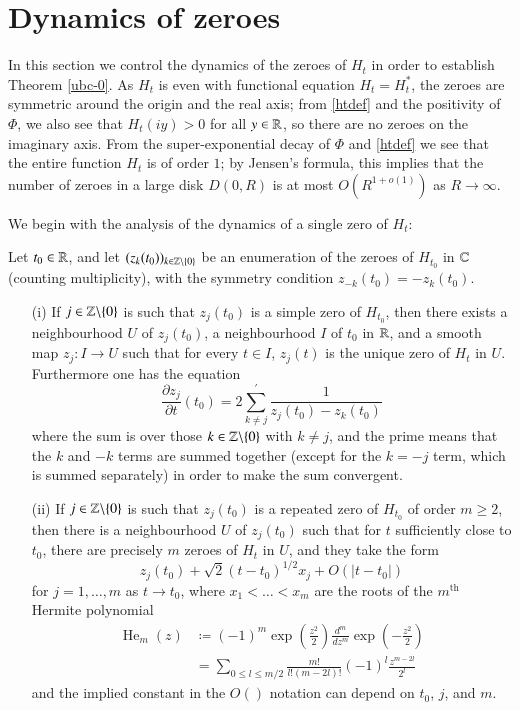 \section{Dynamics of zeroes}\label{dynamics-sec}

In this section we control the dynamics of the zeroes of $H_t$ in order to establish Theorem \ref{ubc-0}.  As $H_t$ is even with functional equation $H_t = H_t^*$, the zeroes are symmetric around the origin and the real axis; from \eqref{htdef} and the positivity of $\Phi$, we also see that $H_t(iy) > 0$ for all $y \in \mathbb{R}$, so there are no zeroes on the imaginary axis.  From the super-exponential decay of $\Phi$ and \eqref{htdef} we see that the entire function $H_t$ is of order $1$; by Jensen's formula, this implies that the number of zeroes in a large disk $D(0,R)$ is at most $O( R^{1+o(1)})$ as $R \to \infty$.

We begin with the analysis of the dynamics of a single zero of $H_t$:

\begin{proposition}\label{dynam}  Let $t_0 \in \mathbb{R}$, and let $(z_k(t_0))_{k \in \mathbb{Z} \backslash \{0\}}$ be an enumeration of the zeroes of $H_{t_0}$ in $\mathbb{C}$ (counting multiplicity), with the symmetry condition $z_{-k}(t_0) = -z_k(t_0)$.
\begin{itemize}
\item[(i)]  If $j \in \mathbb{Z} \backslash \{0\}$ is such that $z_j(t_0)$ is a simple zero of $H_{t_0}$, then there exists a neighbourhood $U$ of $z_j(t_0)$, a neighbourhood $I$ of $t_0$ in $\mathbb{R}$, and a smooth map $z_j: I \to U$ such that for every $t \in I$, $z_j(t)$ is the unique zero of $H_t$ in $U$.  Furthermore one has the equation
\begin{equation}\label{zjk}
 \frac{\partial z_j}{\partial t}(t_0) = 2 \sum^{\prime}_{k \neq j} \frac{1}{z_j(t_0) - z_k(t_0)} 
\end{equation}
where the sum is over those $k \in \mathbb{Z} \backslash \{0\}$ with $k \neq j$, and the prime means that the $k$ and $-k$ terms are summed together (except for the $k=-j$ term, which is summed separately) in order to make the sum convergent.
\item[(ii)]  If $j \in \mathbb{Z} \backslash \{0\}$ is such that $z_j(t_0)$ is a repeated zero of $H_{t_0}$ of order $m \geq 2$, then there is a neighbourhood $U$ of $z_j(t_0)$ such that for $t$ sufficiently close to $t_0$, there are precisely $m$ zeroes of $H_t$ in $U$, and they take the form
$$ z_j(t_0) + \sqrt{2} (t-t_0)^{1/2} x_j + O( |t-t_0|)$$
for $j=1,\dots,m$ as $t \to t_0$, where $x_1 < \dots < x_m$ are the roots of the $m^{\operatorname{th}}$ Hermite polynomial
\begin{align}
\operatorname{He}_m(z) &\coloneqq (-1)^m \exp\left(\frac{z^2}{2}\right) \frac{d^m}{dz^m} \exp\left(-\frac{z^2}{2}\right)\label{heform}\\
&= \sum_{0 \leq l \leq m/2} \frac{m!}{l! (m-2l)!} (-1)^l \frac{z^{m-2l}}{2^l}\label{heform2}
\end{align}
and the implied constant in the $O()$ notation can depend on $t_0$, $j$, and $m$.
\end{itemize}
\end{proposition}

